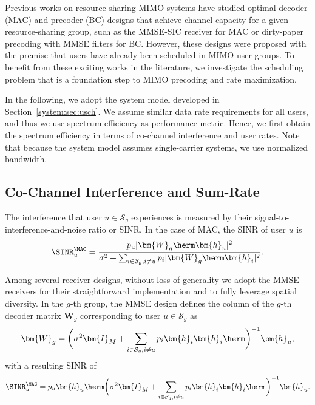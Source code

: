 Previous works on resource-sharing MIMO systems have studied optimal decoder (MAC) and precoder (BC) designs that achieve channel capacity for a given resource-sharing group, such as the MMSE-SIC receiver \cite{Tse05} for MAC or dirty-paper precoding \cite{Costa1983} with MMSE filters for BC. 
However, these designs were proposed with the premise that users have already been scheduled in MIMO user groups.
To benefit from these exciting works in the literature, we investigate the scheduling problem that is a foundation step to MIMO precoding and rate maximization. 

In the following, we adopt the system model developed in Section~\ref{system:sec:usch}. We assume similar data rate requirements for all users, and thus we use spectrum efficiency as performance metric.  Hence, we first obtain the spectrum efficiency in terms of co-channel interference and user rates. Note that because the system model assumes single-carrier systems, we use normalized bandwidth.

\subsection{Co-Channel Interference and Sum-Rate}
The interference that user $u\in\mathcal{S}_g$ experiences is measured by their signal-to-interference-and-noise ratio or SINR. In the case of MAC, the SINR of user $u$ is 
\begin{align}
	\SINR_u^{\MAC} = \frac{p_u|\bm{W}_g\herm\bm{h}_u|^2}{\sigma^2+\sum_{i\in\mathcal{S}_{g},i\neq u}p_i|\bm{W}_g\herm\bm{h}_i|^2}.
	\label{usch:eqn:sinr_mac}
\end{align}

Among several receiver designs, without loss of generality we adopt the MMSE receivers \cite{Tse05} for their straightforward implementation and to fully leverage spatial diversity. In the $g$-th group, the MMSE design defines the column of the $g$-th decoder matrix $\bm{W}_g$ corresponding to user $u\in\mathcal{S}_g$ as 
\begin{align}
	\bm{W}_{g}=\bigg(\sigma^2\bm{I}_M+\sum_{i\in\mathcal{S}_g,i\neq u} p_i\bm{h}_i\bm{h}_i\herm\bigg)^{-1}\bm{h}_u,
\end{align}
with a resulting SINR of
\begin{align}
	\SINR_u^{\MAC} = p_u\bm{h}_u\herm\bigg(\sigma^2\bm{I}_M+\sum_{i\in\mathcal{S}_g,i\neq u} p_i\bm{h}_i\bm{h}_i\herm\bigg)^{-1}\bm{h}_u.
	\label{usch:eqn:sinr_mac_mrc}
\end{align}

